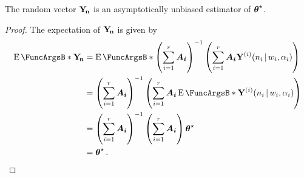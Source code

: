 \documentclass[
    11pt,
    extrafontsizes,
    article,
    oldfontcommands,
    final,
    oneside,
    openany,
    hidelinks]{memoir}
\begin{document}
\begin{theorem}
The random vector $\mathrm{\boldsymbol{\mathbf{Y_{\!n}}}}$ is an asymptotically unbiased estimator of ${\boldsymbol{\mathbf{\theta}}}^{\star}$.
\end{theorem}
\begin{proof}
The expectation of $\mathrm{\boldsymbol{\mathbf{Y_{\!n}}}}$ is given by
\begin{align}
    \Expect{\sampdu}
    &= \Expect{\left( \sum_{i=1}^{r} \matrx{A_i} \right)^{-1} \left( \sum_{i=1}^{r} \matrx{A_i} \sampdir{n_i}{w_i,\alpha_i}{i} \right)}\\
    &=  \left( \sum_{i=1}^{r} \matrx{A_i} \right)^{-1}
            \left( \sum_{i=1}^{r} \matrx{A_i}
            \Expect{\sampdir{n_i}{w_i,\alpha_i}{i}}\right)\\    
    &= \left( \sum_{i=1}^{r} \matrx{A_i} \right)^{-1} \left(\sum_{i=1}^{r} \matrx{A_i} \right) \tparam\sysparamvec\\
    &= \tparam\sysparamvec\,.
\end{align}
\end{proof}
\end{document}
